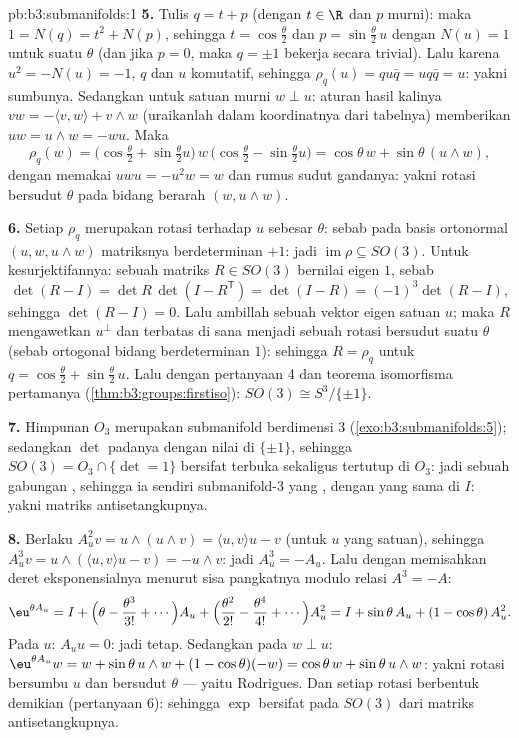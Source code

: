 \begin{solution}{pb:b3:submanifolds:1}
\textbf{5.} Tulis $q = t + p$ (dengan $t \in \R$ dan $p$ murni): maka $1 =
N(q) = t^2 + N(p)$, sehingga $t = \cos\frac\theta2$ dan $p =
\sin\frac\theta2\,u$ dengan $N(u) = 1$ untuk suatu $\theta$
(dan jika $p = 0$, maka $q = \pm1$ bekerja secara trivial). Lalu karena $u^2 = -N(u)
= -1$, $q$ dan $u$ komutatif, sehingga $\rho_q(u) = qu\bar q =
uq\bar q = u$: yakni sumbunya. Sedangkan untuk satuan murni $w \perp u$:
aturan hasil kalinya $vw = -\langle v, w\rangle + v\wedge w$
(uraikanlah dalam koordinatnya dari tabelnya) memberikan $uw = u\wedge w
= -wu$. Maka
\[
\rho_q(w) = \bigl(\cos\tfrac\theta2 +
\sin\tfrac\theta2u\bigr)\,w\,\bigl(\cos\tfrac\theta2 -
\sin\tfrac\theta2u\bigr)
= \cos\theta\,w + \sin\theta\,(u\wedge w),
\]
dengan memakai $uwu = -u^2w = w$ dan rumus sudut gandanya: yakni
rotasi bersudut $\theta$ pada bidang berarah $(w,
u\wedge w)$.

\textbf{6.} Setiap $\rho_q$ merupakan rotasi terhadap $u$ sebesar
$\theta$: sebab pada basis ortonormal $(u, w, u\wedge w)$
matriksnya berdeterminan $+1$: jadi $\operatorname{im}\rho \subseteq
SO(3)$. Untuk kesurjektifannya: sebuah matriks $R \in SO(3)$ bernilai eigen $1$, sebab
\[
\det(R - I) = \det R\,\det(I - R^{\mathsf T}) = \det(I - R)
= (-1)^3\det(R - I),
\]
sehingga $\det(R - I) = 0$. Lalu ambillah sebuah vektor eigen satuan $u$; maka $R$
mengawetkan $u^\perp$ dan terbatas di sana menjadi sebuah rotasi bersudut
suatu $\theta$ (sebab ortogonal bidang berdeterminan $1$):
sehingga $R = \rho_q$ untuk $q = \cos\frac\theta2 +
\sin\frac\theta2\,u$. Lalu dengan pertanyaan 4 dan teorema
isomorfisma pertamanya (\cref{thm:b3:groups:firstiso}): $SO(3)
\cong S^3/\{\pm1\}$.

\textbf{7.} Himpunan $O_3$ merupakan submanifold  berdimensi $3$
(\cref{exo:b3:submanifolds:5}); sedangkan $\det$  padanya
dengan nilai di $\{\pm1\}$, sehingga $SO(3) = O_3\cap\{\det = 1\}$
bersifat terbuka sekaligus tertutup di $O_3$: jadi sebuah gabungan ,
sehingga ia sendiri submanifold-$3$ yang , dengan 
yang sama di $I$: yakni matriks antisetangkupnya.

\textbf{8.} Berlaku $A_u^2v = u\wedge(u\wedge v) = \langle u,
v\rangle u - v$ (untuk $u$ yang satuan), sehingga $A_u^3v = u\wedge(\langle
u,v\rangle u - v) = -u\wedge v$: jadi $A_u^3 = -A_u$. Lalu dengan memisahkan
deret eksponensialnya menurut sisa pangkatnya modulo relasi
$A^3 = -A$:
\[
\eu^{\theta A_u} = I + \Bigl(\theta - \frac{\theta^3}{3!} +
\cdots\Bigr)A_u + \Bigl(\frac{\theta^2}{2!} -
\frac{\theta^4}{4!} + \cdots\Bigr)A_u^2
= I + \sin\theta\,A_u + (1 - \cos\theta)\,A_u^2 .
\]
Pada $u$: $A_uu = 0$: jadi tetap. Sedangkan pada $w \perp u$: $\eu^{\theta
A_u}w = w + \sin\theta\,u\wedge w + (1 - \cos\theta)(-w) =
\cos\theta\,w + \sin\theta\,u\wedge w$: yakni rotasi bersumbu
$u$ dan bersudut $\theta$ --- yaitu Rodrigues. Dan setiap rotasi berbentuk
demikian (pertanyaan 6): sehingga $\exp$ bersifat pada $SO(3)$ dari
matriks antisetangkupnya.


\end{solution}

